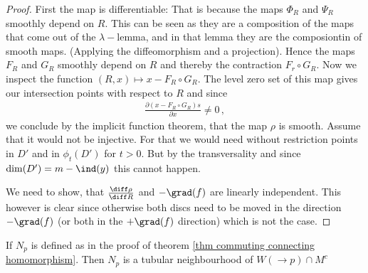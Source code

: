 \begin{proof}
	First the map is differentiable: That is because the maps $\Phi_R$ and $\Psi_R$ smoothly depend on $R$. This can be seen as they are a composition of the maps that come out of the $\lambda-$lemma, and in that lemma they are the composiontin of smooth maps. (Applying the diffeomorphism and a projection). Hence the maps $F_R$ and $G_R$ smoothly depend on $R$ and thereby the contraction $F_r\circ G_R$. Now we inspect the function $(R,x)\mapsto x-F_R\circ G_R$. The level zero set of this map gives our intersection points with respect to $R$ and since
	\begin{align*}
		\frac{\partial (x-F_R\circ G_R)s}{\partial x}\neq 0 \, ,
	\end{align*} we conclude by the implicit function theorem, that the map $\rho$ is smooth. 
	Assume that it would not be injective. For that we would need without restriction points in $D'$ and in $\phi_t(D')$ for $t>0$. But by the transversality and since $\dim(D')=m-\ind(y)$ this cannot happen.
	
	We need to show, that $\frac{\diff \rho}{\diff R}$ and $-\grad(f)$ are linearly independent. This however is clear since otherwise both discs need to be moved in the direction $-\grad(f)$ (or both in the  $+\grad(f)$ direction) which is not the case.   
	
	
\end{proof}
\begin{lemma}
If $N_p$ is defined as in the proof of theorem \ref{thm commuting connecting homomorphism}. Then $N_p$ is a tubular neighbourhood of $W(\to p)\cap M^c$
\end{lemma}
